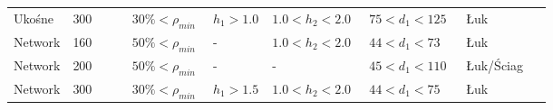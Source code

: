 \begin{table}[hbt!]
\begin{tabular}{@{}p{0.11\linewidth} P{0.11\linewidth} P{0.15\linewidth} P{0.11\linewidth} P{0.18\linewidth} P{0.18\linewidth} P{0.16\linewidth}@{}}
			Ukośne  & 300                  & $30\%<\rho_{min}$ & $h_1>1.0$           & $1.0<h_2<2.0$      & $75<d_1<125$         & Łuk          \\
			Network & 160                  & $50\%<\rho_{min}$      & -                    & $1.0<h_2<2.0$      & $44<d_1<73\ $          & Łuk          \\
			Network & 200                  & $50\%<\rho_{min}$      & -                    & -                    & $45<d_1<110$         & Łuk/Ściag    \\
			Network & 300                  & $30\%<\rho_{min}$ & $h_1>1.5$           & $1.0<h_2<2.0$      & $44<d_1<75\ $          & Łuk          \\ \bottomrule
	\end{tabular}
	\label{tab:summary_optimization}
\end{table}
